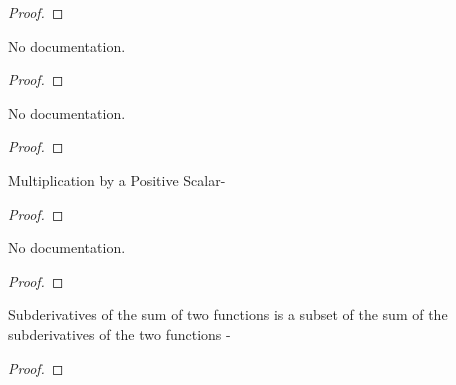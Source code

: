 \begin{proof}
    \leanok
\end{proof}

\begin{theorem}\label{isMinOn_of_HasSubgradentWithinAt_zero}
        \leanok
                No documentation.
    \end{theorem}

\begin{proof}
    \leanok
\end{proof}

\begin{theorem}\label{HasSubgradientWithinAt_zero_iff_isMinOn}
        \leanok
                No documentation.
    \end{theorem}

\begin{proof}
    \leanok
\end{proof}

\begin{theorem}\label{HasSubgradientAt.pos_smul}
        \leanok
                Multiplication by a Positive Scalar-
    \end{theorem}

\begin{proof}
    \leanok
\end{proof}

\begin{theorem}\label{SubderivAt.pos_smul}
        \leanok
                No documentation.
    \end{theorem}

\begin{proof}
    \leanok
\end{proof}

\begin{theorem}\label{SubderivAt.add_subset}
        \leanok
                Subderivatives of the sum of two functions is a subset of the sum of the
subderivatives of the two functions -
    \end{theorem}

\begin{proof}
    \leanok
\end{proof}

